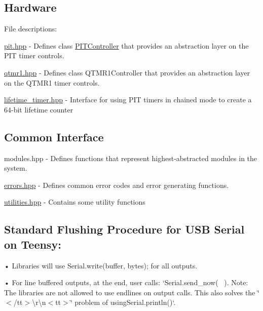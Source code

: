 \subsection*{Hardware}

File descriptions\+:


\begin{DoxyItemize}
\item {\ttfamily \hyperlink{pit_8hpp}{pit.\+hpp}} -\/ Defines {\ttfamily class \hyperlink{classPITController}{P\+I\+T\+Controller}} that provides an abstraction layer on the P\+IT timer controls.
\item {\ttfamily \hyperlink{qtmr1_8hpp}{qtmr1.\+hpp}} -\/ Defines \textquotesingle{}class Q\+T\+M\+R1\+Controller\textquotesingle{} that provides an abstraction layer on the Q\+T\+M\+R1 timer controls.
\item {\ttfamily \hyperlink{lifetime__timer_8hpp}{lifetime\+\_\+timer.\+hpp}} -\/ Interface for using P\+IT timers in chained mode to create a 64-\/bit lifetime counter
\end{DoxyItemize}

\subsection*{Common Interface}


\begin{DoxyItemize}
\item {\ttfamily modules.\+hpp} -\/ Defines functions that represent highest-\/abstracted modules in the system.
\item {\ttfamily \hyperlink{errors_8hpp}{errors.\+hpp}} -\/ Defines common error codes and error generating functions.
\item {\ttfamily \hyperlink{utilities_8hpp}{utilities.\+hpp}} -\/ Contains some utility functions
\end{DoxyItemize}

\subsection*{Standard Flushing Procedure for U\+SB Serial on Teensy\+:}

• Libraries will use {\ttfamily Serial.\+write(buffer, bytes);} for all outputs.

• For line buffered outputs, at the end, user calls\+: `\+Serial.send\+\_\+now(\textquotesingle{}~\newline
\textquotesingle{}){\ttfamily . Note\+: The libraries are not allowed to use endlines on output calls. This also solves the \char`\"{}$<$/tt$>$\textbackslash{}r\textbackslash{}n$<$tt$>$\char`\"{} problem of using}Serial.\+println()`.

